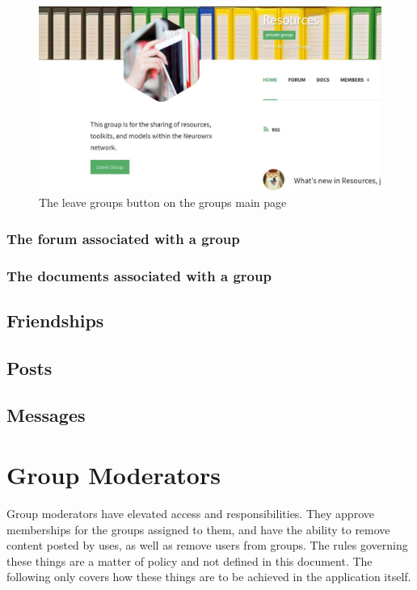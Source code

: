 \documentclass[10pt]{article}
\begin{document}
\begin{figure}[h]
    \centering
    \includegraphics[scale=0.3]{images/leavegroup.jpg}
    \caption{The leave groups button on the groups main page}
    \label{leavegroup}
\end{figure}

\subsubsection{The forum associated with a group}
\subsubsection{The documents associated with a group}

\subsection{Friendships} \label{Friendships}
\subsection{Posts}
\subsection{Messages}

\section{Group Moderators}
Group moderators have elevated access and responsibilities.  They approve memberships for the groups assigned to them, and have the ability to remove content posted by uses, as well as remove users from groups.  The rules governing these things are a matter of policy and not defined in this document.  The following only covers how these things are to be achieved in the application itself. 
\end{document}
